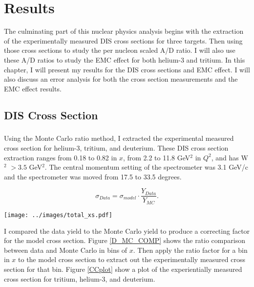 
\chapter{Results}
The culminating part of this nuclear physics analysis begins with the extraction of the experimentally measured DIS cross sections for three targets. Then using those cross sections to study the per nucleon scaled A/D ratio. I will also use these A/D ratios to study the EMC effect for both helium-3 and tritium. In this chapter, I will present my results for the DIS cross sections and EMC effect. I will also discuss an error analysis for both the cross section measurements and the EMC effect results. 
\section{DIS Cross Section}
\paragraph{}Using the Monte Carlo ratio method, I extracted the experimental measured cross section for helium-3, tritium, and deuterium. These DIS cross section extraction ranges from 0.18 to 0.82 in $x$, from 2.2 to 11.8 GeV$^2$ in $Q^2$, and has W$^2$ $>3.5$ GeV$^2$. The central momentum setting of the spectrometer was 3.1 GeV/c and the spectrometer was moved from 17.5 to 33.5 degrees.

\begin{equation}
\sigma_{Data} = \sigma_{model} \cdot \frac{Y_{Data}}{Y_{MC}}. \nonumber
\end{equation}
\begin{sidewaysfigure}
	\texttt{[image: ../images/total\_xs.pdf]}
	\caption{Experimentally measured cross section using the Monte Carlo ratio method for tritium, helium-3, and deuterium. Normalization uncertainty due to target thickness uncertainty for tritium= 0.97\%, helium-3 = 1.12\%, and deuterium = 0.56\%.}
    \label{CCplot}
\end{sidewaysfigure}

I compared the data yield to the Monte Carlo yield to produce a correcting factor for the model cross section. Figure \ref{D_MC_COMP} shows the ratio comparison between data and Monte Carlo in bins of $x$. Then apply the ratio factor for a bin in $x$ to the model cross section to extract out the experimentally measured cross section for that bin. Figure \ref{CCplot} show a plot of the experientially measured cross section for tritium, helium-3, and deuterium. 


